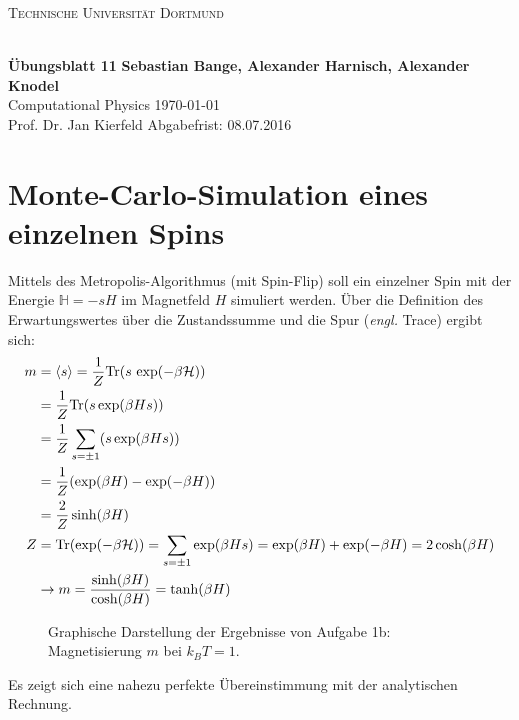 
\usepackage{verbatim}
\usepackage{ulem}
\usepackage{braket}
\newcommand\OverfullCenter[1]{\noindent\makebox[\linewidth]{#1}}

\noindent
\centerline{\small{\textsc{Technische Universität Dortmund}}} \\
\large\textbf{Übungsblatt 11} \hfill \footnotesize\textbf{Sebastian Bange, Alexander Harnisch, Alexander Knodel} \\
\normalsize Computational Physics \hfill \today \\
Prof. Dr. Jan Kierfeld \hfill Abgabefrist: 08.07.2016\\
\noindent\makebox[\linewidth]{\rule{\textwidth}{0.4pt}}

\section*{Monte-Carlo-Simulation eines einzelnen Spins}
Mittels des Metropolis-Algorithmus (mit Spin-Flip) soll ein einzelner Spin mit der Energie $\mathbb{H} = -sH$ im Magnetfeld $H$ simuliert werden.
Über die Definition des Erwartungswertes über die Zustandssumme und die Spur (\textit{engl.} Trace) ergibt sich:
\begin{align}
m &= \braket{s} = \frac{1}{Z} \text{Tr} (s\,\exp(-\beta \mathcal{H})) \\
&= \frac{1}{Z} \text{Tr} (s \exp(\beta H s)) \\
&= \frac{1}{Z} \sum_{s = \pm 1} (s \exp(\beta H s)) \\
&= \frac{1}{Z} (\exp(\beta H) - \exp(-\beta H)) \\
&= \frac{2}{Z} \sinh(\beta H)\\
Z &= \text{Tr}(\exp(-\beta \mathcal{H})) = \sum_{s = \pm 1} \exp(\beta H s) = \exp(\beta H) + \exp(-\beta H) = 2 \cosh(\beta H) \\
&\rightarrow m = \frac{\sinh(\beta H)}{\cosh(\beta H)} = \tanh(\beta H)
\end{align}


\begin{landscape}
	\begin{figure}
		\OverfullCenter{\texttt{[image: ../A1/b.pdf]}}
		\caption{Graphische Darstellung der Ergebnisse von Aufgabe 1b: Magnetisierung $m$ bei $k_B T = 1$.}
		\label{fig:1a}
	\end{figure}
\end{landscape}
Es zeigt sich eine nahezu perfekte Übereinstimmung mit der analytischen Rechnung.


